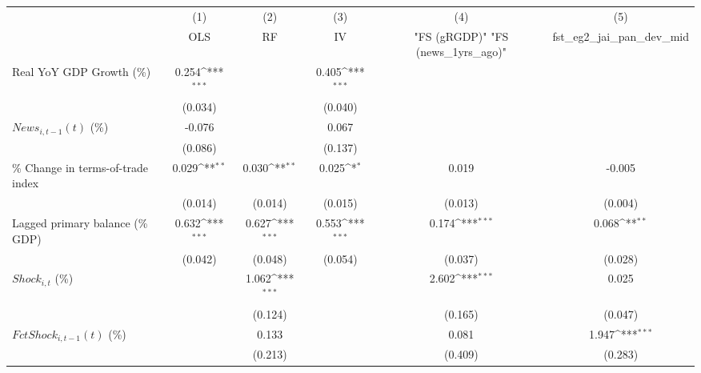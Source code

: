 {
\def\sym#1{\ifmmode^{#1}\else\(^{#1}\)\fi}
\begin{tabular}{l*{5}{c}}
\toprule
                    &\multicolumn{1}{c}{(1)}&\multicolumn{1}{c}{(2)}&\multicolumn{1}{c}{(3)}&\multicolumn{1}{c}{(4)}&\multicolumn{1}{c}{(5)}\\
                    &\multicolumn{1}{c}{OLS}&\multicolumn{1}{c}{RF}&\multicolumn{1}{c}{IV}&\multicolumn{1}{c}{ "FS (gRGDP)"  "FS (news_1yrs_ago)" }&\multicolumn{1}{c}{fst_eg2_jai_pan_dev_mid}\\
\midrule
Real YoY GDP Growth (\%)&       0.254\sym{***}&                     &       0.405\sym{***}&                     &                     \\
                    &     (0.034)         &                     &     (0.040)         &                     &                     \\
\addlinespace
$ News_{i,t-1}(t)$ (\%)&      -0.076         &                     &       0.067         &                     &                     \\
                    &     (0.086)         &                     &     (0.137)         &                     &                     \\
\addlinespace
\% Change in terms-of-trade index&       0.029\sym{**} &       0.030\sym{**} &       0.025\sym{*}  &       0.019         &      -0.005         \\
                    &     (0.014)         &     (0.014)         &     (0.015)         &     (0.013)         &     (0.004)         \\
\addlinespace
Lagged primary balance (\% GDP)&       0.632\sym{***}&       0.627\sym{***}&       0.553\sym{***}&       0.174\sym{***}&       0.068\sym{**} \\
                    &     (0.042)         &     (0.048)         &     (0.054)         &     (0.037)         &     (0.028)         \\
\addlinespace
$ Shock_{i,t}$ (\%) &                     &       1.062\sym{***}&                     &       2.602\sym{***}&       0.025         \\
                    &                     &     (0.124)         &                     &     (0.165)         &     (0.047)         \\
\addlinespace
$ FctShock_{i,t-1}(t)$ (\%)&                     &       0.133         &                     &       0.081         &       1.947\sym{***}\\
                    &                     &     (0.213)         &                     &     (0.409)         &     (0.283)         \\

\end{tabular}}
